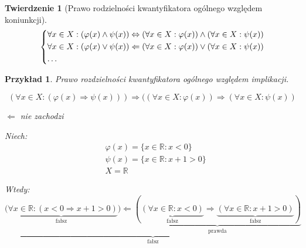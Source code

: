 \documentclass[a5paper,8pt]{article}
\newtheorem{theorem}{Twierdzenie}[section]
\newtheorem*{example}{Przykład}
\begin{document}
            \begin{theorem}[Prawo rodzielności kwantyfikatora ogólnego względem koniunkcji]

                \[
                    \begin{dcases*}
                    \forall x \in X : (\varphi(x) \wedge \psi(x)) \Leftrightarrow (\forall x \in X : \varphi(x)) \wedge (\forall x \in X : \psi(x)) \\
                    \forall x \in X : (\varphi(x) \vee \psi(x)) \Leftarrow (\forall x \in X : \varphi(x)) \vee (\forall x \in X : \psi(x)) \\
                    \ldots
                    \end{dcases*}
                \]

            \end{theorem}

            \begin{example}
                Prawo rozdzielności kwantyfikatora ogólnego względem implikacji.

                \begin{equation*}
                    (\forall x \in X : ( \varphi(x) \Rightarrow \psi(x))) \Rightarrow ((\forall x \in X : \varphi(x)) \Rightarrow (\forall x \in X : \psi(x))
                \end{equation*}

                \begin{center}
                    $ \Leftarrow $ nie zachodzi
                \end{center}

                Niech:
                \begin{equation*}
                    \begin{aligned}
                        & \varphi(x) = \{ x \in \mathbb{R} : x < 0 \} \\
                        & \psi(x) = \{ x \in \mathbb{R} : x + 1 > 0 \} \\
                        & X = \mathbb{R}
                    \end{aligned}
                \end{equation*}

                Wtedy:
                \begin{equation*}
                    \underbrace{\underbrace{(\forall x \in \mathbb{R} : (x < 0 \Rightarrow x + 1 > 0 )}_{\text{fałsz}})
                    \Leftarrow \underbrace{(\underbrace{(\forall x \in \mathbb{R} : x < 0)}_{\text{fałsz}} \Rightarrow \underbrace{(\forall x \in \mathbb{R} : x + 1 > 0)}_{\text{fałsz}})}_{\text{prawda}}}_{\text{fałsz}}
                \end{equation*}

            \end{example}
\end{document}
